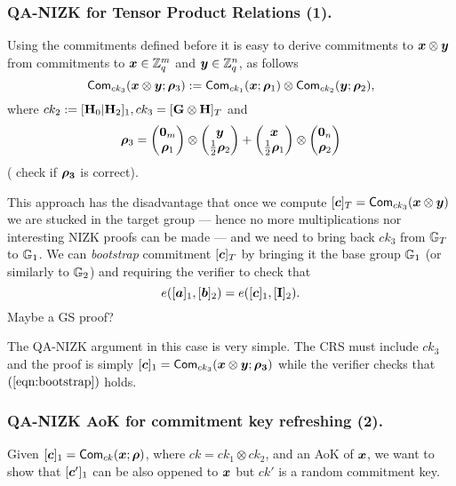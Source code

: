 \subsubsection{QA-NIZK for Tensor Product Relations (1).}
Using the commitments defined before it is easy to derive commitments to ${\boldsymbol{x}}\otimes{\boldsymbol{y}}$ from commitments to ${\boldsymbol{x}}\in\mathbb{Z}_q^m$ and ${\boldsymbol{y}}\in\mathbb{Z}_q^n$, as follows
$$
\mathsf{Com}_{ck_3}({\boldsymbol{{\boldsymbol{x}}}}\otimes{\boldsymbol{y}};{\boldsymbol{\rho}}_3):=\mathsf{Com}_{ck_1}({\boldsymbol{x}};{\boldsymbol{\rho}}_1)\otimes\mathsf{Com}_{ck_2}({\boldsymbol{y}};{\boldsymbol{\rho}}_2),
$$
where $ck_2:=[\mathbf{{H}}_0|\mathbf{{H}}_2]_1,ck_3=[\mathbf{{G}}\otimes\mathbf{{H}}]_T$ and
$${\boldsymbol{\rho}}_3=\left(\begin{matrix}{\boldsymbol{0}}_m\\{\boldsymbol{\rho}}_1\end{matrix}\right)\otimes\left(\begin{matrix}{\boldsymbol{y}}\\\frac{1}{2}{\boldsymbol{\rho}}_2\end{matrix}\right)+\left(\begin{matrix}{\boldsymbol{x}}\\\frac{1}{2}{\boldsymbol{\rho}}_1\end{matrix}\right)\otimes\left(\begin{matrix}{\boldsymbol{0}}_n\\{\boldsymbol{\rho}}_2\end{matrix}\right)$$ ({\color{red} check if ${\boldsymbol{\rho_3}}$ is correct}).

This approach has the disadvantage that once we compute $[{\boldsymbol{c}}]_T=\allowbreak\mathsf{Com}_{ck_3}({\boldsymbol{x}}\otimes{\boldsymbol{y}})$ we are stucked in the target group --- hence no more multiplications nor interesting NIZK proofs can be made --- and we need to bring back $ck_3$ from $\mathbb{G}_T$ to $\mathbb{G}_1$. We can \emph{bootstrap} commitment $[{\boldsymbol{c}}]_T$  by bringing it the base group $\mathbb{G}_1$ (or similarly to $\mathbb{G}_2$) and requiring the verifier to check that
\begin{equation}
e([{\boldsymbol{a}}]_1,[{\boldsymbol{b}}]_2)=e([{\boldsymbol{c}}]_1,[\mathbf{{I}}]_{2}).\label{eqn:bootstrap}
\end{equation}
{\color{red} Maybe a GS proof? }

The QA-NIZK argument in this case is very simple. The CRS must include $ck_3$ and the proof is simply $[{\boldsymbol{c}}]_1=\mathsf{Com}_{ck_3}({\boldsymbol{x}}\otimes{\boldsymbol{y}};{\boldsymbol{\rho_3}})$ while the verifier checks that $(\ref{eqn:bootstrap})$ holds.
%
%

\subsubsection{QA-NIZK AoK for commitment key refreshing (2).}
Given $[{\boldsymbol{c}}]_1=\allowbreak\mathsf{Com}_{ck}({\boldsymbol{x}};\allowbreak {\boldsymbol{\rho}})$, where $ck = ck_1\otimes ck_2$, and an AoK of ${\boldsymbol{x}}$, we want to show that $[{\boldsymbol{c}}']_1$ can be also oppened to ${\boldsymbol{x}}$ but $ck'$ is a random commitment key.

